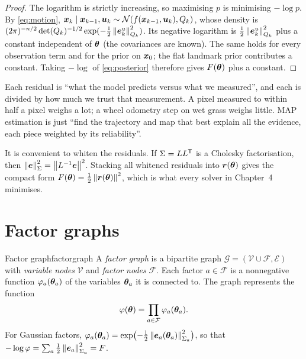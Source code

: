 \begin{proof}
The logarithm is strictly increasing, so maximising $p$ is minimising
$-\log p$. By \eqref{eq:motion}, $\bm{x}_k\mid\bm{x}_{k-1},\bm{u}_k\sim
\mathcal{N}(f(\bm{x}_{k-1},\bm{u}_k),Q_k)$, whose density is
$(2\pi)^{-n/2}\det(Q_k)^{-1/2}\exp(-\tfrac12\left\lVert \bm{e}^u_k\right\rVert^2_{Q_k})$.
Its negative logarithm is $\tfrac12\left\lVert \bm{e}^u_k\right\rVert^2_{Q_k}$ plus a
constant independent of $\bm{\theta}$ (the covariances are known). The same
holds for every observation term and for the prior on $\bm{x}_0$; the flat
landmark prior contributes a constant. Taking $-\log$ of
\eqref{eq:posterior} therefore gives $F(\bm{\theta})$ plus a constant.
\end{proof}

\begin{inwords}
Each residual is ``what the model predicts versus what we measured'', and
each is divided by how much we trust that measurement. A pixel measured to
within half a pixel weighs a lot; a wheel odometry step on wet grass
weighs little. MAP estimation is just ``find the trajectory and map that
best explain all the evidence, each piece weighted by its reliability''.
\end{inwords}

It is convenient to whiten the residuals. If $\Sigma=LL^{\mathsf{T}}$ is a Cholesky
factorisation, then $\left\lVert \bm{e}\right\rVert_\Sigma^2=\left\lVert L^{-1}\bm{e}\right\rVert^2$.
Stacking all whitened residuals into $\bm{r}(\bm{\theta})$ gives the compact
form $F(\bm{\theta})=\tfrac12\left\lVert \bm{r}(\bm{\theta})\right\rVert^2$, which is what every
solver in Chapter~4 minimises.

\section{Factor graphs}

\begin{definition}{Factor graph}{factorgraph}
A \emph{factor graph} is a bipartite graph $\mathcal{G}=(\mathcal{V}\cup
\mathcal{F},\mathcal{E})$ with \emph{variable nodes} $\mathcal{V}$ and
\emph{factor nodes} $\mathcal{F}$. Each factor $a\in\mathcal{F}$ is a
nonnegative function $\varphi_a(\bm{\theta}_a)$ of the variables
$\bm{\theta}_a$ it is connected to. The graph represents the function
\[
  \varphi(\bm{\theta})=\prod_{a\in\mathcal{F}}\varphi_a(\bm{\theta}_a).
\]
For Gaussian factors, $\varphi_a(\bm{\theta}_a)=
\exp\bigl(-\tfrac12\left\lVert \bm{e}_a(\bm{\theta}_a)\right\rVert^2_{\Sigma_a}\bigr)$, so that
$-\log\varphi=\sum_a\tfrac12\left\lVert \bm{e}_a\right\rVert^2_{\Sigma_a}=F$.
\end{definition}

